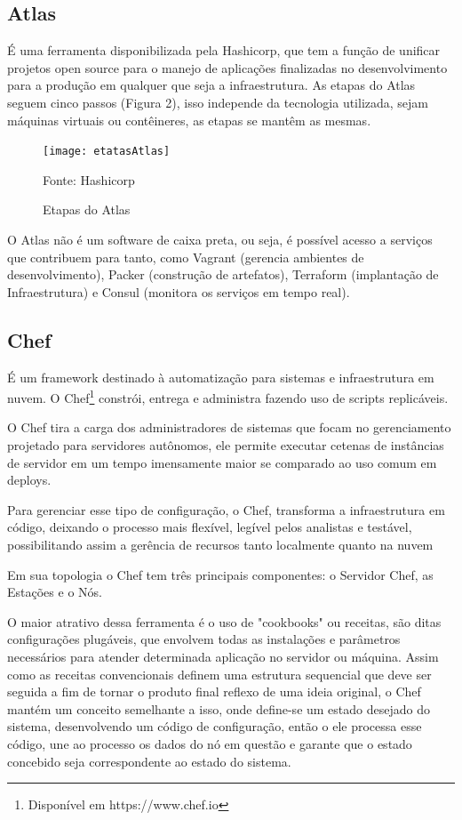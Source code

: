 \subsection{Atlas}
É uma ferramenta disponibilizada pela Hashicorp, que tem a função de unificar projetos open source para o manejo de aplicações finalizadas no desenvolvimento para a produção em qualquer que seja a infraestrutura.
As etapas do Atlas seguem cinco passos (Figura 2), isso independe da tecnologia utilizada, sejam máquinas virtuais ou contêineres, as etapas se mantêm as mesmas.

\begin{figure}[htb]
	\centering
	\texttt{[image: etatasAtlas]}
	\caption{Etapas do Atlas}
	Fonte: Hashicorp
	\label{fig:etatasAtlas}
\end{figure}

O Atlas não é um software de caixa preta, ou seja, é possível acesso a serviços que contribuem para tanto, como Vagrant (gerencia ambientes de desenvolvimento), Packer (construção de artefatos), Terraform (implantação de Infraestrutura) e Consul (monitora os serviços em tempo real).

\subsection{Chef}
É um framework destinado à automatização para sistemas e infraestrutura em nuvem. O Chef\footnote{Disponível em https://www.chef.io} constrói, entrega e administra fazendo uso de scripts replicáveis.

O Chef tira a carga dos administradores de sistemas que focam no gerenciamento projetado para servidores autônomos, ele permite executar cetenas de instâncias de servidor em um tempo imensamente maior se comparado ao uso comum em deploys.

Para gerenciar esse tipo de configuração, o Chef, transforma a infraestrutura em código, deixando o processo mais flexível, legível pelos analistas e testável, possibilitando assim a gerência de recursos tanto localmente quanto na nuvem

Em sua topologia o Chef tem três principais componentes: o Servidor Chef, as Estações e o Nós.

O maior atrativo dessa ferramenta é o uso de "cookbooks" ou receitas, são ditas configurações plugáveis, que envolvem todas as instalações e parâmetros necessários para atender determinada aplicação no servidor ou máquina. Assim como as receitas convencionais definem uma estrutura sequencial que deve ser seguida a fim de tornar o produto final reflexo de uma ideia original, o Chef mantém um conceito semelhante a isso, onde define-se um estado desejado do sistema, desenvolvendo um código de configuração, então o ele processa esse código, une ao processo os dados do nó em questão e garante que o estado concebido seja correspondente ao estado do sistema. 

